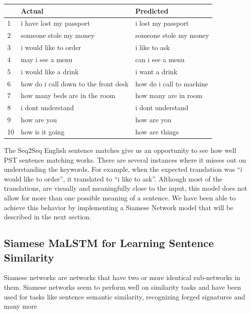 \documentclass[runningheads]{llncs}
\begin{document}
	\begin{table} 
		\begin{center}
			\begin{tabular}{| l | l | l | |}			
				\hline
				 & Actual \ & Predicted  \\
				 \hline
					1 & i have lost my passport & i lost my passport \\
				    \hline				
					2 & someone stole my money & someone stole my money \\
					\hline
					3 & i would like to order & i like to ask \\
					\hline
					4 & may i see a menu & can i see a menu \\
					\hline
					5 & i would like a drink & i want a drink   \\
					\hline
					6 & how do i call down to the front desk & how do i call to machine    \\
					\hline
				    7 & how many beds are in the room & how many are  in  room       \\
				    \hline
					8 & i dont understand & i dont understand   \\
					\hline
					9 & how are you &  how are you  \\
					\hline
					10 & how is it going & how are things    \\
				\hline
			\end{tabular}
		\end{center}
		\label{table:English Sentence Matches}
	\end{table}

	The Seq2Seq English sentence matches give us an opportunity to see how well PST sentence matching works. There are several instances where it misses out on understanding the keywords. For example, when the expected translation was “i would like to order”, it translated to “i like to ask”. Although most of the translations, are visually and meaningfully close to the input, this model does not allow for more than one possible meaning of a sentence. We have been able to achieve this behavior by implementing a Siamese Network model that will be described in the next section.
	
	
	\subsection{Siamese MaLSTM for Learning Sentence Similarity}	
	Siamese networks are networks that have two or more identical sub-networks in them.
	Siamese networks seem to perform well on similarity tasks and have been used for tasks like sentence semantic similarity, recognizing forged signatures and many more
	
\end{document}
